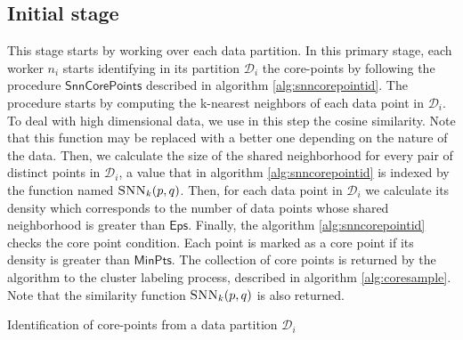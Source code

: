 \documentclass[smallextended]{svjour3}       %
\begin{document}
\subsection*{Initial stage}
This stage starts by working over each data partition. 
In this primary stage, each worker $n_i$ starts identifying in its partition $\mathcal{D}_i$ the core-points by following the procedure $\mathsf{SnnCorePoints}$ described in algorithm \ref{alg:snncorepointid}. The procedure starts by computing the k-nearest neighbors of each data point in $\mathcal{D}_i$. To deal with high dimensional data, we use in this step the cosine similarity. Note that this function may be replaced with a better one depending on the nature of the data. Then, we calculate the size of the shared neighborhood for every pair of distinct points in $\mathcal{D}_i$, a value that in algorithm \ref{alg:snncorepointid} is indexed by the function named $\textsc{SNN}_k(p,q)$. Then, for each data point in $\mathcal{D}_i$ we calculate its density which corresponds to the number of data points 
whose shared neighborhood is greater than $\mathsf{Eps}$. Finally, the algorithm \ref{alg:snncorepointid} checks the core point condition. Each point is marked as a core point if its density is greater than $\mathsf{MinPts}$. The collection of core points is returned by the algorithm to the cluster labeling process, described in algorithm \ref{alg:coresample}. Note that the similarity function $\textsc{SNN}_k(p,q)$ is also returned. 

\iffalse
\begin{algorithm}[!htbp]
   \DontPrintSemicolon
  
\caption{Identification of core-points from a data partition $\mathcal{D}_i$}
\label{alg:snncorepointid}
\end{algorithm}
\end{document}
